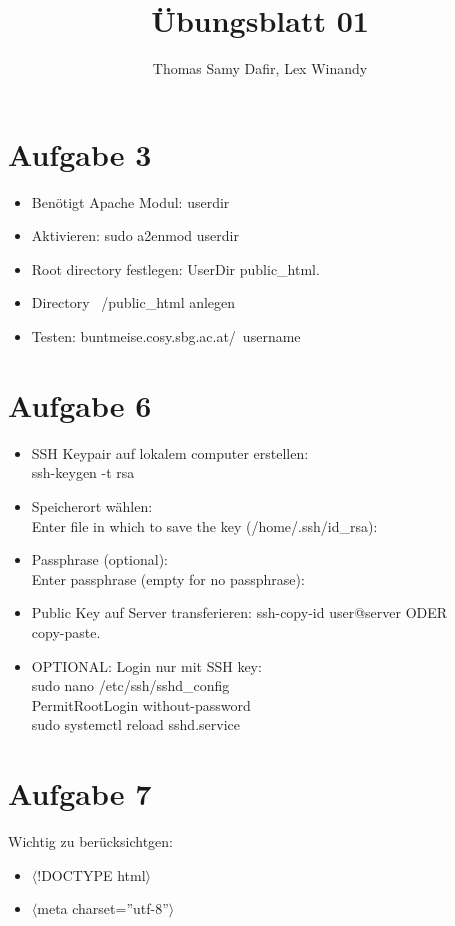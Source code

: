 \documentclass[12pt, a4paper]{report}
\title{Übungsblatt 01}
\author{Thomas Samy Dafir, Lex Winandy}
\date{}
\begin{document}
\maketitle

\section{Aufgabe 3}
\begin{itemize}
	\item Benötigt Apache Modul: userdir
	\item Aktivieren: sudo a2enmod userdir
	\item Root directory festlegen: UserDir public\_html.
	\item Directory ~/public\_html anlegen
	\item Testen: buntmeise.cosy.sbg.ac.at/~username
\end{itemize}

\section{Aufgabe 6}
\begin{itemize}
	\item SSH Keypair auf lokalem computer erstellen:\\
	ssh-keygen -t rsa
	\item Speicherort wählen:\\
	Enter file in which to save the key (/home/.ssh/id\_rsa):
	\item Passphrase (optional):\\
	Enter passphrase (empty for no passphrase):
	\item Public Key auf Server transferieren:
	ssh-copy-id user@server ODER \\
	copy-paste.
	\item OPTIONAL: Login nur mit SSH key:\\
	sudo nano /etc/ssh/sshd\_config\\
	PermitRootLogin without-password\\
	sudo systemctl reload sshd.service
\end{itemize}

\section{Aufgabe 7}
Wichtig zu berücksichtgen:
\begin{itemize}
	\item $\langle$!DOCTYPE html$\rangle$
	\item $\langle$meta charset=''utf-8''$\rangle$
\end{itemize}
\end{document}
